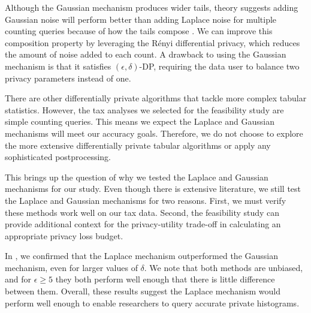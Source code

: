 Although the Gaussian mechanism produces wider tails, theory suggests adding Gaussian noise will perform better than adding Laplace noise for multiple counting queries because of how the tails compose \citep{wang2019subsampled}. We can improve this composition property by leveraging the R\'enyi differential privacy, which reduces the amount of noise added to each count. A drawback to using the Gaussian mechanism is that it satisfies $(\epsilon,\delta)$-DP, requiring the data user to balance two privacy parameters instead of one.

There are other differentially private algorithms that tackle more complex tabular statistics. However, the tax analyses we selected for the feasibility study are simple counting queries. This means we expect the Laplace and Gaussian mechanisms will meet our accuracy goals. Therefore, we do not choose to explore the more extensive differentially private tabular algorithms or apply any sophisticated postprocessing.

This brings up the question of why we tested the Laplace and Gaussian mechanisms for our study. Even though there is extensive literature, we still test the Laplace and Gaussian mechanisms for two reasons. First, we must verify these methods work well on our tax data. Second, the feasibility study can provide additional context for the privacy-utility trade-off in calculating an appropriate privacy loss budget.

In \citet{barrientos2021}, we confirmed that the Laplace mechanism outperformed the Gaussian mechanism, even for larger values of $\delta$. We note that both methods are unbiased, and for $\epsilon \geq 5$ they both perform well enough that there is little difference between them. Overall, these results suggest the Laplace mechanism would perform well enough to enable researchers to query accurate private histograms.


